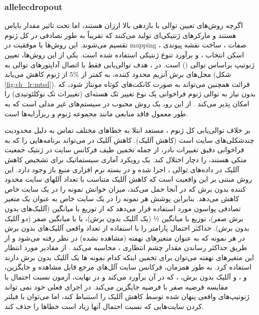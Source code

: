 \subsubsection{\gls{allelecdropout}}
اگرچه روش‌های تعیین توالی با بازدهی بالا \cite{hugo2007epithelial} ارزان هستند، اما تحت تاثیر مقدار بایاس هستند و مارکرهای ژنتیکی‌ای تولید می‌کنند که تقریباً به طور تصادفی در کل ژنوم تقسیم می‌شوند. این روش‌ها با موفقیت در \gls{mapping} صفات \cite{nowell1976clonal, greaves2012clonal}، ساخت نقشه پیوندی \cite{sakr1993frequency, fearon1990genetic}،  اسکن انتخاب  \cite{dentro2018portraits, waclaw2015spatial}،  و برآورد تنوع ژنتیکی \cite{de2006clonal} استفاده شده است. یکی از این روش‌ها، تعیین ژنوتیپ براساس توالی \cite{anderson2011genetic} () است. در ، هدف توالی‌یابی فقط با اتصال آداپتورهای توالی به محل‌های برش آنزیم محدود کننده، به کمتر از $5\%$ از ژنوم کاهش می‌یابد (شکل \ref{fig:ch_lr:mtsd}).  قرائت  همچنین می‌تواند به صورت کانکت‌های کوتاه مونتاژ شود، که بدون نیاز به توالی ژنوم فراخوانی یک نوع تغییر تک هسته‌ای (تغییرات تک نوکلئوتیدی) را امکان پذیر می‌کند \cite{hanahan2000hallmarks}. از این رو،  یک روش محبوب در سیستم‌های غیر مدلی است که به طور معمول فاقد منابعی مانند مجموعه ژنوم و ریزآرایه‌ها است.

بر خلاف توالی‌یابی کل ژنوم ،  مستعد ابتلا به خطاهای مختلف تماس به دلیل محدودیت چندشکلی‌های سایت  است (کاهش آللیک). کاهش آللیک در  می‌تواند برنامه‌هایی را که به فراخوانی دقیق تغییرات نادر، از جمله تخمین طیف فرکانس سایت در ژنتیک جمعیت متکی هستند، را دچار اختلال کند. یک رویکرد آماری سیستماتیک برای تشخیص کاهش آللیک در داده‌های توالی ، اجرا شده و  در بسته نرم افزاری منبع باز  وجود دارد.  این روش مبتنی بر این واقعیت است که کاهش آللیک متناسب با تعداد آللهای سایت محدود کننده بدون برش که در آنجا حمل می‌کند، میزان خوانش نمونه را در یک سایت خاص کاهش می‌دهد. بنابراین  پوشش هر نمونه را در یک سایت خاص به عنوان یک متغیر تصادفی پواسون مورد استفاده قرار می‌دهد که از توزیع با میانگین \lr{$\lambda$} (آللیک‌های بدون برش صفر)، توزیع با میانگین ½\lr{$\lambda$} (یک آللیک بدون برش)، یا با میانگین صفر (دو آللیک بدون برش).  حداکثر احتمال پارامتر \lr{$\lambda$} را با استفاده از تعداد واقعی آللیک‌های بدون برش در هر نمونه که به عنوان متغیرهای نهفته (مشاهده نشده) در نظر رفته می‌شود و از طریق  حداکثر رساندن  مقدار چشم انتظاری ، محاسبه می‌کند . از مقادیر مورد انتظار این متغیرهای نهفته می‌توان برای تخمین اینکه کدام نمونه ها یک آللیک بدون برش دارند استفاده کرد. به طور همزمان،  فرکانس سایت آلل‌های  مرجع قابل مشاهده و جایگزین،  و    ، و آللیک بدون برش،  ، که در آن     برآورد می‌کند و در نهایت، آزمون نسبت احتمال با مقایسه فرضیه صفر   با فرضیه  جایگزین می‌کند.   در اجرای فعلی خود نمی تواند ژنوتیپ‌های واقعی پنهان شده توسط کاهش آللیک را استنباط کند، اما می‌توان با فیلتر کردن سایت‌هایی که نسبت احتمال آنها زیاد است خطاها را حذف کند.

